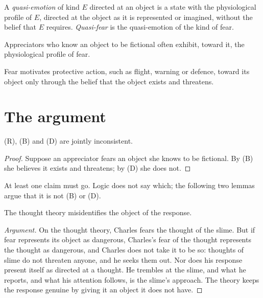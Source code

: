 \documentclass{situationist-preprint}
\begin{document}
\begin{definition}\label{d:quasi}
A \emph{quasi-emotion} of kind $E$ directed at an object is a state with the physiological profile of $E$, directed at the object as it is represented or imagined, without the belief that $E$ requires. \emph{Quasi-fear} is the quasi-emotion of the kind of fear.
\end{definition}

\begin{assumption}[Profile]\label{a:profile}
Appreciators who know an object to be fictional often exhibit, toward it, the physiological profile of fear.
\end{assumption}

\begin{assumption}\label{a:motive}
Fear motivates protective action, such as flight, warning or defence, toward its object only through the belief that the object exists and threatens.
\end{assumption}

\section{The argument}

\begin{proposition}\label{p:triad}
(R), (B) and (D) are jointly inconsistent.
\end{proposition}

\begin{proof}
Suppose an appreciator fears an object she knows to be fictional. By (B) she believes it exists and threatens; by (D) she does not.
\end{proof}

At least one claim must go. Logic does not say which; the following two lemmas argue that it is not (B) or (D).

\begin{lemma}\label{l:thought}
The thought theory misidentifies the object of the response.
\end{lemma}

\begin{proof}[Argument]
On the thought theory, Charles fears the thought of the slime. But if fear represents its object as dangerous, Charles's fear of the thought represents the thought as dangerous, and Charles does not take it to be so: thoughts of slime do not threaten anyone, and he seeks them out. Nor does his response present itself as directed at a thought. He trembles at the slime, and what he reports, and what his attention follows, is the slime's approach. The theory keeps the response genuine by giving it an object it does not have.
\end{proof}
\end{document}
